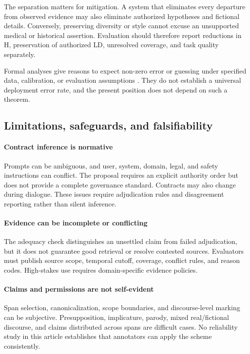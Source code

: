 \documentclass{clv2025}
\newcommand{\LD}{\textsc{LD}}
\newcommand{\Hall}{\textsc{H}}
\begin{document}
The separation matters for mitigation.
A system that eliminates every departure from observed evidence may also
eliminate authorized hypotheses and fictional details.
Conversely, preserving diversity or style cannot excuse an unsupported
medical or historical assertion.
Evaluation should therefore report reductions in \Hall, preservation of
authorized \LD, unresolved coverage, and task quality separately.

Formal analyses give reasons to expect non-zero error or guessing under
specified data, calibration, or evaluation assumptions
\citep{kalai_calibrated_2024,banerjee_llms_2024}.
They do not establish a universal deployment error rate, and the present
position does not depend on such a theorem.

\subsection{Limitations, safeguards, and falsifiability}

\paragraph{Contract inference is normative}
Prompts can be ambiguous, and user, system, domain, legal, and safety
instructions can conflict.
The proposal requires an explicit authority order but does not provide a
complete governance standard.
Contracts may also change during dialogue.
These issues require adjudication rules and disagreement reporting rather
than silent inference.

\paragraph{Evidence can be incomplete or conflicting}
The adequacy check distinguishes an unsettled claim from failed
adjudication, but it does not guarantee good retrieval or resolve contested
sources.
Evaluators must publish source scope, temporal cutoff, coverage, conflict
rules, and reason codes.
High-stakes use requires domain-specific evidence policies.

\paragraph{Claims and permissions are not self-evident}
Span selection, canonicalization, scope boundaries, and discourse-level
marking can be subjective.
Presupposition, implicature, parody, mixed real/fictional discourse, and
claims distributed across spans are difficult cases.
No reliability study in this article establishes that annotators can apply
the scheme consistently.
\end{document}
